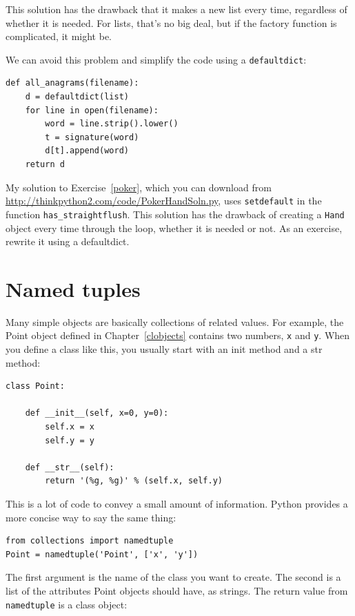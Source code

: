 \documentclass[10pt]{book}
\begin{document}
This solution has the drawback that it makes a new list
every time, regardless of whether it is needed.  For lists,
that's no big deal, but if the factory
function is complicated, it might be.

We can avoid this problem and
simplify the code using a {\tt defaultdict}:

\begin{verbatim}
def all_anagrams(filename):
    d = defaultdict(list)
    for line in open(filename):
        word = line.strip().lower()
        t = signature(word)
        d[t].append(word)
    return d
\end{verbatim}

My solution to Exercise~\ref{poker}, which you can download from
\url{http://thinkpython2.com/code/PokerHandSoln.py},
uses {\tt setdefault} in the function
\verb"has_straightflush".  This solution has the drawback
of creating a {\tt Hand} object every time through the loop, whether
it is needed or not.  As an exercise, rewrite it using
a defaultdict.


\section{Named tuples}

Many simple objects are basically collections of related values.
For example, the Point object defined in Chapter~\ref{clobjects} contains
two numbers, {\tt x} and {\tt y}.  When you define a class like
this, you usually start with an init method and a str method:

\begin{verbatim}
class Point:

    def __init__(self, x=0, y=0):
        self.x = x
        self.y = y

    def __str__(self):
        return '(%g, %g)' % (self.x, self.y)
\end{verbatim}

This is a lot of code to convey a small amount of information.
Python provides a more concise way to say the same thing:

\begin{verbatim}
from collections import namedtuple
Point = namedtuple('Point', ['x', 'y'])
\end{verbatim}

The first argument is the name of the class you want to create.
The second is a list of the attributes Point objects should have,
as strings.  The return value from {\tt namedtuple} is a class object:
\end{document}

